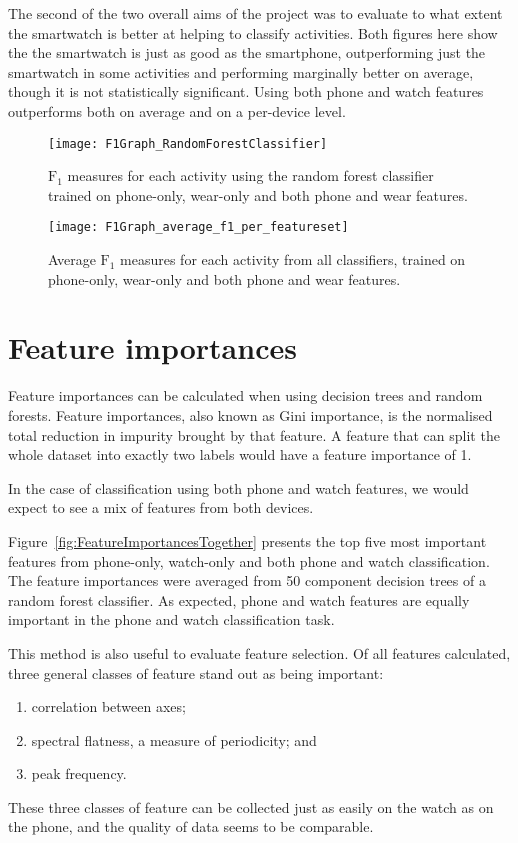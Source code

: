 {{        The second of the two overall aims of the project was to evaluate to what extent the smartwatch is better at helping to classify activities. Both figures here show the the smartwatch is just as good as the smartphone, outperforming just the smartwatch in some activities and performing marginally better on average, though it is not statistically significant. Using both phone and watch features outperforms both on average and on a per-device level.
    \begin{figure}
      \centering
      \texttt{[image: F1Graph\_RandomForestClassifier]}
      \caption{$\mathrm{F}_1$ measures for each activity using the random forest classifier trained on phone-only, wear-only and both phone and wear features.}
      \label{fig:F1Graph_RandomForestClassifier}
    \end{figure}
    \begin{figure}
      \centering
      \texttt{[image: F1Graph\_average\_f1\_per\_featureset]}
      \caption{Average $\mathrm{F}_1$ measures for each activity from all classifiers, trained on phone-only, wear-only and both phone and wear features.}
      \label{fig:F1Graph_average_f1_per_featureset}
    \end{figure}
  
  \section{Feature importances}
    Feature importances can be calculated when using decision trees and random forests. Feature importances, also known as Gini importance, is the normalised total reduction in impurity brought by that feature\cite{breiman2001random}. A feature that can split the whole dataset into exactly two labels would have a feature importance of 1.
    
    In the case of classification using both phone and watch features, we would expect to see a mix of features from both devices.
    
    Figure~\ref{fig:FeatureImportancesTogether} presents the top five most important features from phone-only, watch-only and both phone and watch classification. The feature importances were averaged from 50 component decision trees of a random forest classifier. As expected, phone and watch features are equally important in the phone and watch classification task. 
    
    This method is also useful to evaluate feature selection. Of all features calculated, three general classes of feature stand out as being important:
    \begin{enumerate}
      \item correlation between axes;
      \item spectral flatness, a measure of periodicity; and
      \item peak frequency.
    \end{enumerate}
    These three classes of feature can be collected just as easily on the watch as on the phone, and the quality of data seems to be comparable.
    
}}
